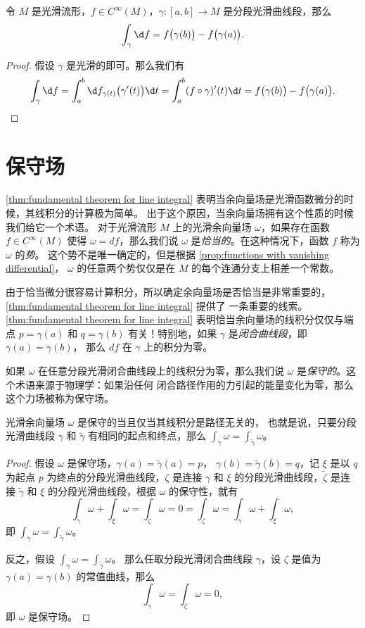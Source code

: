 \begin{theorem}[线积分基本定理]\label{thm:fundamental theorem for line integral}
  令 $M$ 是光滑流形，$f\in C^\infty(M)$，$\gamma:[a,b]\to M$
  是分段光滑曲线段，那么
  \[
    \int_\gamma \d f =f\bigl(\gamma(b)\bigr)-
    f\bigl(\gamma(a)\bigr).
  \]
\end{theorem}
\begin{proof}
  假设 $\gamma$ 是光滑的即可。那么我们有
  \[
    \int_\gamma \d f =
    \int_a^b \d f_{\gamma(t)}\bigl(\gamma'(t)\bigr)\d t
    =\int_a^b (f\circ\gamma)'(t)\d t
    =f\bigl(\gamma(b)\bigr)-
    f\bigl(\gamma(a)\bigr).\qedhere
  \]
\end{proof}

\section{保守场}

\autoref{thm:fundamental theorem for line integral} 
表明当余向量场是光滑函数微分的时候，其线积分的计算极为简单。
出于这个原因，当余向量场拥有这个性质的时候我们给它一个术语。
对于光滑流形 $M$ 上的光滑余向量场 $\omega$，如果存在函数
$f\in C^\infty(M)$ 使得 $\omega=df$，那么我们说 $\omega$
是\emph{恰当的}。在这种情况下，函数 $f$ 称为 $\omega$ 的\emph{势}。
这个势不是唯一确定的，但是根据 \autoref{prop:functions with vanishing differential}，
$\omega$ 的任意两个势仅仅是在 $M$ 的每个连通分支上相差一个常数。

由于恰当微分很容易计算积分，所以确定余向量场是否恰当是非常重要的，
\autoref{thm:fundamental theorem for line integral} 提供了
一条重要的线索。\autoref{thm:fundamental theorem for line integral}
表明恰当余向量场的线积分仅仅与端点 $p=\gamma(a)$ 和 $q=\gamma(b)$
有关！特别地，如果 $\gamma$ 是\emph{闭合曲线段}，即 $\gamma(a)=\gamma(b)$，
那么 $df$ 在 $\gamma$ 上的积分为零。

如果 $\omega$ 在任意分段光滑闭合曲线段上的线积分为零，那么我们说
$\omega$ 是\emph{保守的}。这个术语来源于物理学：如果沿任何
闭合路径作用的力引起的能量变化为零，那么这个力场被称为保守场。

\begin{proposition}
  光滑余向量场 $\omega$ 是保守的当且仅当其线积分是路径无关的，
  也就是说，只要分段光滑曲线段 $\gamma$ 和 $\tilde{\gamma}$
  有相同的起点和终点，那么 $\int_\gamma\omega=\int_{\tilde{\gamma}}\omega$。
\end{proposition}
\begin{proof}
  假设 $\omega$ 是保守场，$\gamma(a)=\tilde{\gamma}(a)=p$，
  $\gamma(b)=\tilde{\gamma}(b)=q$，记 $\xi$ 是以 $q$ 为起点
  $p$ 为终点的分段光滑曲线段，$\zeta$ 是连接 $\gamma$ 和
  $\xi$ 的分段光滑曲线段，$\tilde\zeta$ 是连接 $\tilde\gamma$ 和
  $\xi$ 的分段光滑曲线段，根据 $\omega$ 的保守性，就有
  \[
    \int_{\tilde\gamma}\omega+\int_{\xi}\omega=\int_{\tilde{\zeta}}\omega=0=\int_{\zeta}\omega=\int_{\gamma}\omega+\int_{\xi}\omega,  
  \]
  即 $\int_\gamma\omega=\int_{\tilde\gamma}\omega$。

  反之，假设 $\int_\gamma\omega=\int_{\tilde{\gamma}}\omega$。
  那么任取分段光滑闭合曲线段 $\gamma$，设 $\zeta$ 是值为 $\gamma(a)=\gamma(b)$
  的常值曲线，那么 
  \[
    \int_\gamma\omega=\int_\zeta\omega=0,  
  \]
  即 $\omega$ 是保守场。
\end{proof}

